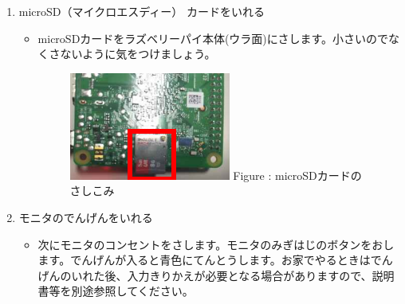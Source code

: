 \documentclass[a4paper,12pt]{jarticle}
\begin{document}
\begin{enumerate}
  \setcounter{enumi}{\value{saveenum}}
  \clearpage
  \item
        microSD（マイクロエスディー）
        カードをいれる

        \begin{itemize}
          \item
                microSDカードをラズベリーパイ本体(ウラ面)にさします。小さいのでなくさないように気をつけましょう。

                \begin{figure}[h]
                  \centering
                  \begin{minipage}{6.334cm}
                    {\upshape
                      \includegraphics[width=5.292cm,height=3.545cm]{textbook-img018.png}
                      \newline
                      Figure : microSDカードのさしこみ}
                  \end{minipage}
                \end{figure}

                \bigskip
        \end{itemize}
  \item モニタのでんげんをいれる

        \begin{itemize}
          \item
                次にモニタのコンセントをさします。モニタのみぎはじのボタンをおします。でんげんが入ると青色にてんとうします。お家でやるときはでんげんのいれた後、入力きりかえが必要となる場合がありますので、説明書等を別途参照してください。



\end{itemize}
\end{enumerate}
\end{document}
